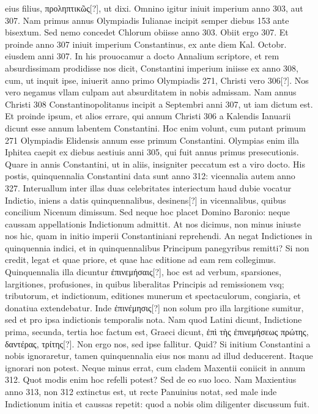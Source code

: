 eius filius, \textgreek{προληπτικῶς[?]}, ut dixi.
Omnino igitur iniuit imperium anno
303, aut 307.
Nam primus annus Olympiadis Iulianae incipit semper
diebus 153 ante bisextum.
Sed nemo concedet Chlorum obiisse
anno 303.
Obiit ergo 307.
Et proinde anno 307 iniuit imperium
Constantinus, ex ante diem  Kal. Octobr. eiusdem anni 307.
In his prouocamur a docto Annalium scriptore, et rem absurdissimam
prodidisse nos dicit, Constantini imperium iniisse ex anno
308, cum, ut inquit ipse, iniuerit anno primo Olympiadis 271,
Christi vero 306[?].
Nos vero negamus vllam culpam aut absurditatem
in nobis admissam.
Nam annus Christi 308 Constantinopolitanus
incipit a Septembri anni 307, ut iam dictum est.
Et proinde ipsum, et alios errare, qui annum Christi 306 a
 Kalendis Ianuarii
dicunt esse annum labentem Constantini.
Hoc enim volunt,
cum putant primum 271 Olympiadis Elidensis annum esse primum
Constantini.
%
Olympias enim illa Iphitea caepit ex diebus aestiuis
anni 305, qui fuit annus primus presecutionis.
Quare in annis
Constantini, ut in aliis, insigniter peccatum est a viro docto.
His
postis, quinquennalia Constantini data sunt anno 312: vicennalia
autem anno 327.
Interuallum inter illas duas celebritates interiectum
haud dubie vocatur Indictio, iniens a datis quinquennalibus,
desinens[?] in vicennalibus, quibus concilium Nicenum dimissum.
Sed neque hoc placet Domino Baronio: neque caussam appellationis
Indictionum admittit.
At nos dicimus, non minus iniuste nos
hic, quam in initio imperii Constantiniani reprehendi.
An negat
Indictiones in quinquennia indici, et in quinquennalibus Principum
panegyribus remitti?
Si non credit, legat et quae priore, et quae
hac editione ad eam rem collegimus.
Quinquennalia illa dicuntur
\textgreek{ἐπινεμήσαις[?]}, hoc est ad verbum, sparsiones,
 largitiones, profusiones, in
quibus liberalitas Principis ad remissionem vsq; tributorum, et indictionum,
editiones munerum et spectaculorum, congiaria, et donatiua
extendebatur.
Inde \textgreek{ἐπινέμησις[?]} non solum pro illa largitione
sumitur, sed et pro ipsa indictionis temporalis nota.
Nam quod Latini
dicunt, Indictione prima, secunda, tertia hoc factum est, Graeci
dicunt, \textgreek{ἐπὶ τὴς ἐπινεμήσεως πρώτης, δαντέρας, τρίτης[?]}.
Non ergo nos, sed ipse fallitur.
Quid?
Si initium Constantini a nobis ignoraretur, tamen quinquennalia
eius nos manu ad illud deducerent.
Itaque ignorari non
potest.
Neque minus errat, cum cladem Maxentii coniicit in annum
312.
Quot modis enim hoc refelli potest?
Sed de eo suo loco.
Nam
Maxientius anno 313, non 312 extinctus est, ut recte Panuinius notat,
sed male inde Indictionum initia et caussas repetit: quod a nobis
olim diligenter discussum fuit.

